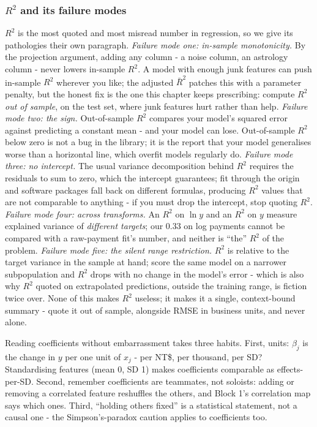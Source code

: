 \documentclass[11pt,a4paper]{article}
\begin{document}
\subsubsection{$R^2$ and its failure modes}
$R^2$ is the most quoted and most misread number in regression, so we
give its pathologies their own paragraph. \emph{Failure mode one:
in-sample monotonicity.} By the projection argument, adding any column -
a noise column, an astrology column - never lowers in-sample $R^2$. A
model with enough junk features can push in-sample $R^2$ wherever you
like; the adjusted $\bar R^2$ patches this with a parameter penalty, but
the honest fix is the one this chapter keeps prescribing: compute $R^2$
\emph{out of sample}, on the test set, where junk features hurt rather
than help. \emph{Failure mode two: the sign.} Out-of-sample $R^2$
compares your model's squared error against predicting a constant mean -
and your model can lose. Out-of-sample $R^2$ below zero is not a bug in
the library; it is the report that your model generalises worse than a
horizontal line, which overfit models regularly do. \emph{Failure mode
three: no intercept.} The usual variance decomposition behind $R^2$
requires the residuals to sum to zero, which the intercept guarantees;
fit through the origin and software packages fall back on different
formulas, producing $R^2$ values that are not comparable to anything -
if you must drop the intercept, stop quoting $R^2$. \emph{Failure mode
four: across transforms.} An $R^2$ on $\ln y$ and an $R^2$ on $y$
measure explained variance of \emph{different targets}; our 0.33 on log
payments cannot be compared with a raw-payment fit's number, and neither
is ``the'' $R^2$ of the problem. \emph{Failure mode five: the silent
range restriction.} $R^2$ is relative to the target variance in the
sample at hand; score the same model on a narrower subpopulation and
$R^2$ drops with no change in the model's error - which is also why
$R^2$ quoted on extrapolated predictions, outside the training range,
is fiction twice over. None of this makes $R^2$ useless; it makes it a
single, context-bound summary - quote it out of sample, alongside RMSE
in business units, and never alone.

Reading coefficients without embarrassment takes three habits. First,
units: $\beta_j$ is the change in $y$ per one unit of $x_j$ - per NT\$,
per thousand, per SD? Standardising features (mean 0, SD 1) makes
coefficients comparable as effects-per-SD. Second, remember coefficients
are teammates, not soloists: adding or removing a correlated feature
reshuffles the others, and Block 1's correlation map says which ones.
Third, ``holding others fixed'' is a statistical statement, not a causal
one - the Simpson's-paradox caution applies to coefficients too.
\end{document}
